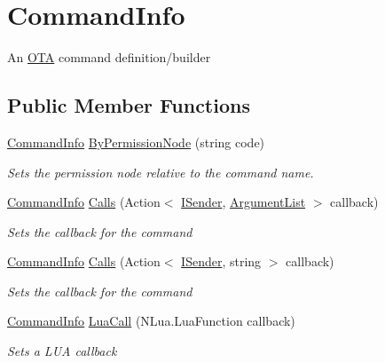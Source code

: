 \hypertarget{classOTA_1_1Command_1_1CommandInfo}{}\section{Command\+Info}
\label{classOTA_1_1Command_1_1CommandInfo}


An \hyperlink{namespaceOTA}{O\+T\+A} command definition/builder  


\subsection*{Public Member Functions}
\begin{DoxyCompactItemize}
\item 
\hyperlink{classOTA_1_1Command_1_1CommandInfo}{Command\+Info} \hyperlink{classOTA_1_1Command_1_1CommandInfo_a99e4b6101f6f60b07940c1742086bfb3}{By\+Permission\+Node} (string code)
\begin{DoxyCompactList}\small\item\em Sets the permission node relative to the command name. \end{DoxyCompactList}\item 
\hyperlink{classOTA_1_1Command_1_1CommandInfo}{Command\+Info} \hyperlink{classOTA_1_1Command_1_1CommandInfo_a1a2a0224609201df48ae6415a6b9c16e}{Calls} (Action$<$ \hyperlink{interfaceOTA_1_1Command_1_1ISender}{I\+Sender}, \hyperlink{classOTA_1_1Command_1_1ArgumentList}{Argument\+List} $>$ callback)
\begin{DoxyCompactList}\small\item\em Sets the callback for the command \end{DoxyCompactList}\item 
\hyperlink{classOTA_1_1Command_1_1CommandInfo}{Command\+Info} \hyperlink{classOTA_1_1Command_1_1CommandInfo_a804f53f1e52bdf956fb1b564685c6657}{Calls} (Action$<$ \hyperlink{interfaceOTA_1_1Command_1_1ISender}{I\+Sender}, string $>$ callback)
\begin{DoxyCompactList}\small\item\em Sets the callback for the command \end{DoxyCompactList}\item 
\hyperlink{classOTA_1_1Command_1_1CommandInfo}{Command\+Info} \hyperlink{classOTA_1_1Command_1_1CommandInfo_adac5f629125ad017db4df1f3aeba5fae}{Lua\+Call} (N\+Lua.\+Lua\+Function callback)
\begin{DoxyCompactList}\small\item\em Sets a L\+U\+A callback \end{DoxyCompactList}\item 

\end{DoxyCompactItemize}
